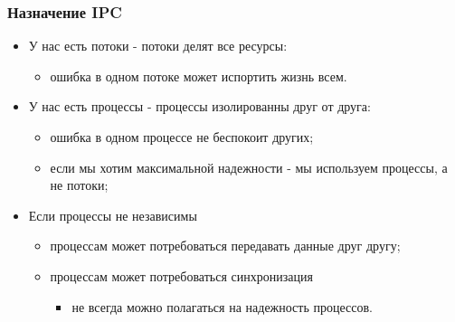 \begin{frame}
\frametitle{Назначение IPC}

\begin{itemize}
  \item У нас есть потоки - потоки делят все ресурсы:
    \begin{itemize}
      \item ошибка в одном потоке может испортить жизнь всем.
    \end{itemize}
  \item У нас есть процессы - процессы изолированны друг от друга:
    \begin{itemize}
      \item ошибка в одном процессе не беспокоит других;
      \item если мы хотим максимальной надежности - мы используем процессы, а не потоки;
    \end{itemize}
  \item Если процессы не независимы
    \begin{itemize}
      \item процессам может потребоваться передавать данные друг другу;
      \item процессам может потребоваться синхронизация
        \begin{itemize}
          \item не всегда можно полагаться на надежность процессов.
        \end{itemize}
    \end{itemize}
\end{itemize}
\end{frame}
